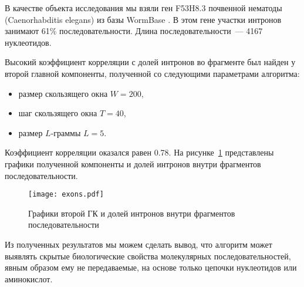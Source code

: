 В качестве объекта исследования мы взяли ген F53H8.3 почвенной нематоды (Caenorhabditis elegans) из базы WormBase \cite{Harris2003}. В этом гене участки интронов занимают 61\% последовательности. Длина последовательности~--- 4167 нуклеотидов.

Высокий коэффициент корреляции с долей интронов во фрагменте был найден у второй главной компоненты, полученной со следующими параметрами алгоритма:

\begin{itemize}
  \item размер скользящего окна $W = 200$,
  \item шаг скользящего окна $T = 40$,
  \item размер $L$-граммы $L = 5$.
\end{itemize}

Коэффициент корреляции оказался равен 0.78. На рисунке~\ref{exons} представлены графики полученной компоненты и долей интронов внутри фрагментов последовательности.

\begin{figure}[!t]
  \centering
  \texttt{[image: exons.pdf]}
  \caption{Графики второй ГК и долей интронов внутри фрагментов последовательности}
  \label{exons}
\end{figure}

Из полученных результатов мы можем сделать вывод, что алгоритм может выявлять скрытые биологические свойства молекулярных последовательностей, явным образом ему не передаваемые, на основе только цепочки нуклеотидов или аминокислот.
